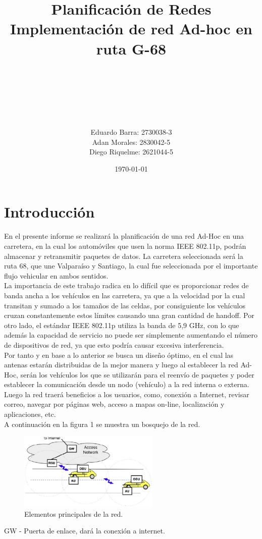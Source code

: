 \documentclass[12pt]{article}
\title{\large Planificación de Redes \\ \huge Implementación de red Ad-hoc en ruta G-68\\}
\author{\\ \ \\ \ \\ \ \\ \ \\ \ \\
	Eduardo Barra: 2730038-3\\
	Adan Morales: 2830042-5\\
	Diego Riquelme: 2621044-5}
\date{\today}
\begin{document}
\maketitle
\newpage
\tableofcontents
\thispagestyle{empty}

\newpage
\section{Introducción}

En el presente informe se realizará la planificación de una red Ad-Hoc en una carretera, en la 
cual los automóviles que usen la norma IEEE 802.11p, podrán almacenar y retransmitir paquetes de datos. 
La carretera seleccionada será la ruta 68, que une Valparaíso y Santiago, la cual fue seleccionada por 
el importante flujo vehicular en ambos sentidos.\\

La importancia de este trabajo radica en lo difícil que es proporcionar redes de banda ancha a los 
vehículos en las carretera, ya que a la velocidad por la cual transitan y sumado a los  tamaños de las 
celdas, por consiguiente los vehículos cruzan constantemente estos límites causando una gran cantidad 
de handoff. Por otro lado, el estándar IEEE 802.11p utiliza la banda de 5,9 GHz, con lo que además la
capacidad de servicio no puede ser 
simplemente aumentando el número de dispositivos de red, ya que esto podría causar excesiva 
interferencia.\\

Por tanto y en base a lo anterior se busca un diseño óptimo, en el cual las antenas estarán distribuidas
de la mejor manera y luego al establecer la red Ad-Hoc, serán los vehículos los que se utilizarán para 
el reenvío de paquetes y poder establecer la comunicación desde un nodo (vehículo) a la red interna o 
externa.\\

Luego la red traerá beneficios a los usuarios, como, conexión a Internet, revisar correo, navegar por 
páginas web, acceso a mapas on-line, localización y aplicaciones, etc.\\

A continuación en la figura 1 se muestra un bosquejo de la red.
\begin{figure}[H]
  \centering
      \includegraphics[width=0.6\textwidth]{img1}
	    \caption{Elementos principales de la red.}
	\label{fig:adhoc}
\end{figure}
\footnotesize
GW - Puerta de enlace, dará la conexión a internet.
\end{document}
